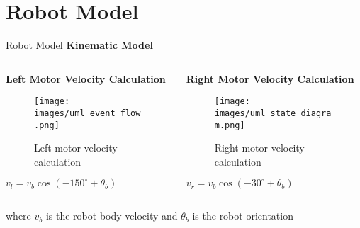 \documentclass[aspectratio=169]{beamer}
\begin{document}
\section{Robot Model}

\begin{frame}{Robot Model}
  \large{\textbf{Kinematic Model}}
  \vspace{0.3cm}
  
  \begin{columns}
    \begin{column}{0.5\textwidth}
      \textbf{Left Motor Velocity Calculation}
      \begin{figure}
        \centering
        \texttt{[image: images/uml\_event\_flow.png]}
        \caption{Left motor velocity calculation}
      \end{figure}
      \begin{center}
        $v_l = v_b \cos(-150^{\circ} + \theta_b)$
      \end{center}
    \end{column}
    \begin{column}{0.5\textwidth}
      \textbf{Right Motor Velocity Calculation}
      \begin{figure}
        \centering
        \texttt{[image: images/uml\_state\_diagram.png]}
        \caption{Right motor velocity calculation}
      \end{figure}
      \begin{center}
        $v_r = v_b \cos(-30^{\circ} + \theta_b)$
      \end{center}
    \end{column}
  \end{columns}
  
  \vspace{0.5cm}
  \begin{center}
  \end{center}
  
  \vspace{0.2cm}
  \small{where $v_b$ is the robot body velocity and $\theta_b$ is the robot orientation}
\end{frame}
\end{document}
